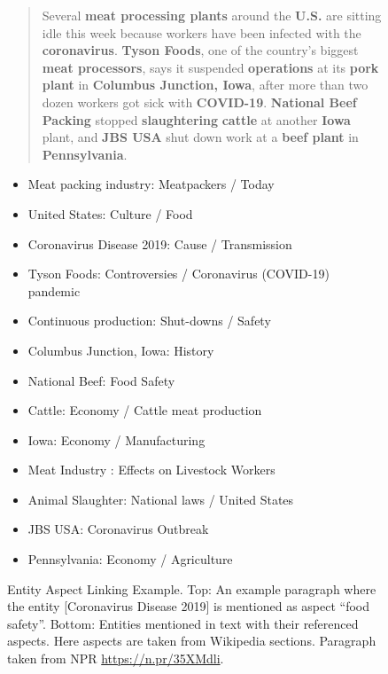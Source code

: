 
\begin{figure}
\justify
\begin{quote}
Several \textbf{meat processing plants} around the \textbf{U.S.} are sitting idle this week because workers have been infected with the \textbf{coronavirus}. \textbf{Tyson Foods}, one of the country's biggest \textbf{meat processors}, says it suspended \textbf{operations} at its \textbf{pork plant} in \textbf{Columbus Junction, Iowa}, after more than two dozen workers got sick with \textbf{COVID-19}. \textbf{National Beef Packing} stopped \textbf{slaughtering} \textbf{cattle} at another \textbf{Iowa} plant, and \textbf{JBS USA} shut down work at a \textbf{beef plant} in \textbf{Pennsylvania}.
\end{quote}

\begin{small}
\begin{itemize}
\item Meat packing industry:  Meatpackers / Today
\item United States: Culture / Food
\item Coronavirus Disease 2019: Cause / Transmission
\item Tyson Foods: Controversies / Coronavirus (COVID-19) pandemic
\item Continuous production: Shut-downs / Safety
\item Columbus Junction, Iowa: History
\item National Beef: Food Safety
\item Cattle: Economy / Cattle meat production
\item Iowa: Economy / Manufacturing
\item Meat Industry : Effects on Livestock Workers
\item Animal Slaughter: National laws / United States
\item JBS USA: Coronavirus Outbreak
\item Pennsylvania: Economy / Agriculture
\end{itemize}
\end{small}


\caption{Entity Aspect Linking Example. Top: An example paragraph where the entity [Coronavirus Disease 2019] is mentioned as aspect ``food safety''.  Bottom: Entities mentioned in text with their referenced aspects. Here aspects are taken from Wikipedia sections. Paragraph taken from NPR \url{https://n.pr/35XMdli}.}
\label{fig:introexample}

\end{figure}